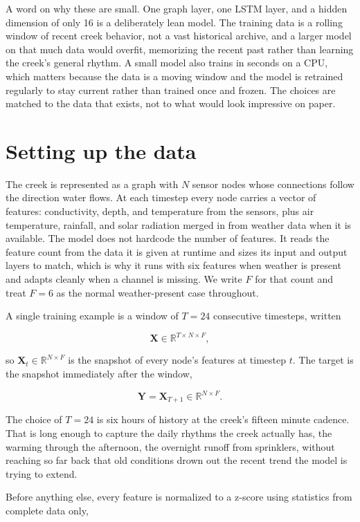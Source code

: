 \documentclass[11pt]{article}
\begin{document}
A word on why these are small. One graph layer, one LSTM layer, and a hidden dimension of only 16 is a deliberately lean model. The training data is a rolling window of recent creek behavior, not a vast historical archive, and a larger model on that much data would overfit, memorizing the recent past rather than learning the creek's general rhythm. A small model also trains in seconds on a CPU, which matters because the data is a moving window and the model is retrained regularly to stay current rather than trained once and frozen. The choices are matched to the data that exists, not to what would look impressive on paper.

\section*{Setting up the data}

The creek is represented as a graph with $N$ sensor nodes whose connections follow the direction water flows. At each timestep every node carries a vector of features: conductivity, depth, and temperature from the sensors, plus air temperature, rainfall, and solar radiation merged in from weather data when it is available. The model does not hardcode the number of features. It reads the feature count from the data it is given at runtime and sizes its input and output layers to match, which is why it runs with six features when weather is present and adapts cleanly when a channel is missing. We write $F$ for that count and treat $F = 6$ as the normal weather-present case throughout.

A single training example is a window of $T = 24$ consecutive timesteps, written

\[
\mathbf{X} \in \mathbb{R}^{T \times N \times F},
\]

so $\mathbf{X}_t \in \mathbb{R}^{N \times F}$ is the snapshot of every node's features at timestep $t$. The target is the snapshot immediately after the window,

\[
\mathbf{Y} = \mathbf{X}_{T+1} \in \mathbb{R}^{N \times F}.
\]

The choice of $T = 24$ is six hours of history at the creek's fifteen minute cadence. That is long enough to capture the daily rhythms the creek actually has, the warming through the afternoon, the overnight runoff from sprinklers, without reaching so far back that old conditions drown out the recent trend the model is trying to extend.

Before anything else, every feature is normalized to a z-score using statistics from complete data only,
\end{document}
